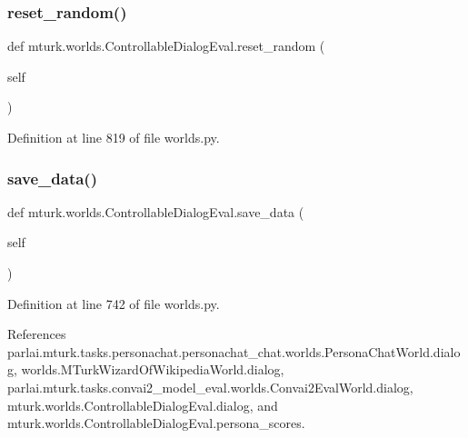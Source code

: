 \subsubsection{\texorpdfstring{reset\+\_\+random()}{reset\_random()}}
{\footnotesize\ttfamily def mturk.\+worlds.\+Controllable\+Dialog\+Eval.\+reset\+\_\+random (\begin{DoxyParamCaption}\item[{}]{self }\end{DoxyParamCaption})}



Definition at line 819 of file worlds.\+py.

\mbox{\label{classmturk_1_1worlds_1_1ControllableDialogEval_a06ae5d6d90beaa223da2dcb8ac6597ce}} 
\subsubsection{\texorpdfstring{save\+\_\+data()}{save\_data()}}
{\footnotesize\ttfamily def mturk.\+worlds.\+Controllable\+Dialog\+Eval.\+save\+\_\+data (\begin{DoxyParamCaption}\item[{}]{self }\end{DoxyParamCaption})}



Definition at line 742 of file worlds.\+py.



References parlai.\+mturk.\+tasks.\+personachat.\+personachat\+\_\+chat.\+worlds.\+Persona\+Chat\+World.\+dialog, worlds.\+M\+Turk\+Wizard\+Of\+Wikipedia\+World.\+dialog, parlai.\+mturk.\+tasks.\+convai2\+\_\+model\+\_\+eval.\+worlds.\+Convai2\+Eval\+World.\+dialog, mturk.\+worlds.\+Controllable\+Dialog\+Eval.\+dialog, and mturk.\+worlds.\+Controllable\+Dialog\+Eval.\+persona\+\_\+scores.

\mbox{\label{classmturk_1_1worlds_1_1ControllableDialogEval_aa8888a3df7cb8610c0bde2d826557d99}} 
